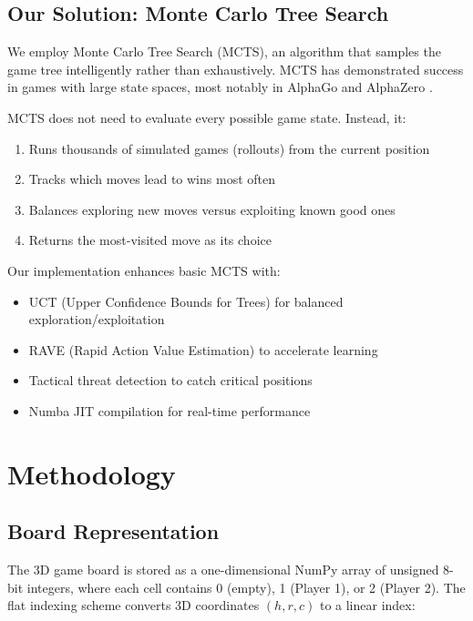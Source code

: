 \documentclass[11pt]{article}
\begin{document}
\subsection{Our Solution: Monte Carlo Tree Search}

We employ Monte Carlo Tree Search (MCTS), an algorithm that samples the game tree intelligently rather than exhaustively. MCTS has demonstrated success in games with large state spaces, most notably in AlphaGo and AlphaZero \cite{silver2017}.

MCTS does not need to evaluate every possible game state. Instead, it:
\begin{enumerate}
    \item Runs thousands of simulated games (rollouts) from the current position
    \item Tracks which moves lead to wins most often
    \item Balances exploring new moves versus exploiting known good ones
    \item Returns the most-visited move as its choice
\end{enumerate}

Our implementation enhances basic MCTS with:
\begin{itemize}
    \item UCT (Upper Confidence Bounds for Trees) for balanced exploration/exploitation
    \item RAVE (Rapid Action Value Estimation) to accelerate learning
    \item Tactical threat detection to catch critical positions
    \item Numba JIT compilation for real-time performance
\end{itemize}

\section{Methodology}

\subsection{Board Representation}

The 3D game board is stored as a one-dimensional NumPy array of unsigned 8-bit integers, where each cell contains 0 (empty), 1 (Player 1), or 2 (Player 2). The flat indexing scheme converts 3D coordinates $(h, r, c)$ to a linear index:
\end{document}
